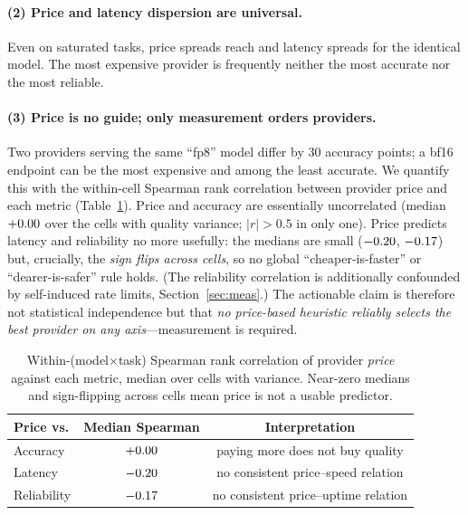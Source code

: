 \documentclass{article}
\begin{document}
\paragraph{(2) Price and latency dispersion are universal.} Even on saturated tasks, price
spreads reach \maxpricex{} and latency spreads \maxlatx{} for the identical model. The most
expensive provider is frequently neither the most accurate nor the most reliable.

\paragraph{(3) Price is no guide; only measurement orders providers.} Two providers serving the
same ``fp8'' model differ by 30 accuracy points; a bf16 endpoint can be the most expensive and
among the least accurate. We quantify this with the within-cell Spearman rank correlation
between provider price and each metric (Table~\ref{tab:corr}). Price and accuracy are
essentially uncorrelated (median $+0.00$ over the \corrqualn{} cells with quality variance;
$|r|>0.5$ in only one). Price predicts latency and reliability no more usefully: the medians are
small ($-0.20$, $-0.17$) but, crucially, the \emph{sign flips across cells}, so no
global ``cheaper-is-faster'' or ``dearer-is-safer'' rule holds. (The reliability correlation is
additionally confounded by self-induced rate limits, Section~\ref{sec:meas}.) The actionable
claim is therefore not statistical independence but that \emph{no price-based heuristic reliably
selects the best provider on any axis}---measurement is required.

\begin{table}[t]\centering\small
\caption{Within-(model$\times$task) Spearman rank correlation of provider \emph{price} against
each metric, median over cells with variance. Near-zero medians and sign-flipping across cells
mean price is not a usable predictor.}
\label{tab:corr}
\begin{tabular}{lcc}
\toprule
Price vs. & Median Spearman & Interpretation \\
\midrule
Accuracy     & $+0.00$ & paying more does not buy quality \\
Latency      & $-0.20$  & no consistent price--speed relation \\
Reliability  & $-0.17$  & no consistent price--uptime relation \\
\bottomrule
\end{tabular}
\end{table}
\end{document}
